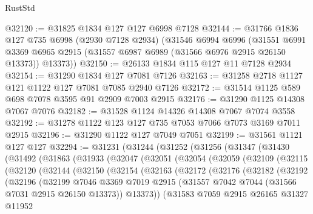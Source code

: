 \begin{lexlean}{RustStd}
\begin{coremodule}
@32120 := @31825 @1834 @127 @127 @6998 @7128
@32144 := @31766
    @1836
    @127
    @735
    @6998
    (@2930 @7128 @2934)
    (@31546
      @6994
      @6996
      (@31551
        @6991
        @3369
        @6965
        @2915
        (@31557 @6987 @6989 (@31566 @6976 @2915 @26150 @13373))
        @13373))
@32150 := @26133 @1834 @115 @127 @11 @7128 @2934
@32154 := @31290 @1834 @127 @7081 @7126
@32163 := @31258 @2718 @1127 @121 @1122 @127 @7081 @7085 @2940 @7126
@32172 := @31514 @1125 @589 @698 @7078 @3595 @91 @2909 @7003 @2915
@32176 := @31290 @1125 @14308 @7067 @7076
@32182 := @31528 @1124 @14326 @14308 @7067 @7074 @3558
@32192 := @31278 @1122 @123 @127 @735 @7053 @7066 @7073 @3169 @7011 @2915
@32196 := @31290 @1122 @127 @7049 @7051
@32199 := @31561 @1121 @127 @127
@32294 := @31231
    (@31244
      (@31252
        (@31256
          (@31347
            (@31430
              (@31492
                (@31863
                  (@31933
                    (@32047
                      (@32051
                        (@32054
                          (@32059
                            (@32109
                              (@32115
                                (@32120
                                  (@32144
                                    (@32150
                                      (@32154
                                        (@32163
                                          (@32172
                                            (@32176
                                              (@32182
                                                (@32192
                                                  (@32196
                                                    (@32199
                                                      @7046
                                                      @3369
                                                      @7019
                                                      @2915
                                                      (@31557
                                                        @7042
                                                        @7044
                                                        (@31566 @7031 @2915 @26150 @13373))
                                                      @13373))
                                                  (@31583
                                                    @7059
                                                    @2915
                                                    @26165
                                                    @31327
                                                    @11952

\end{coremodule}
\end{lexlean}
